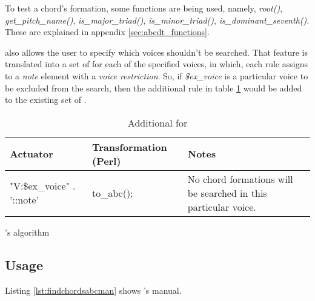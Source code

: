 To test a chord's formation, some \abcdt{} functions are being used, namely, \emph{root()},
\emph{get\_pitch\_name()}, \emph{is\_major\_triad()}, \emph{is\_minor\_triad()},
\emph{is\_dominant\_seventh()}. These are explained in appendix \ref{sec:abcdt_functions}.

\findchordsabc{} also allows the user to specify which voices shouldn't be searched. That feature is
translated into a set of \abcdtrules{} for each of the specified voices, in which, each rule assigns
\toabc{} to a \emph{note} element with a \emph{voice restriction}. So, if \emph{\$ex\_voice} is a
particular voice to be excluded from the search, then the additional rule in table
\ref{tab:find_chords_abc_additional_rule} would be added to the existing set of \abcdtrules{}.

\begin{center}
  \begin{table}[h]
    \begin{tabular}{|p{4.5cm}|p{4cm}|p{6.5cm}|}
      \hline
      Actuator & Transformation (Perl) & Notes\\
      \hline
      \hline
      "V:\$ex\_voice" . '::note' & to\_abc(); & No chord formations will be searched in this
      particular voice.\\
      \hline
    \end{tabular}
    \caption{Additional \abcdtrules{} for \findchordsabc{}}
    \label{tab:find_chords_abc_additional_rule}
  \end{table}
\end{center}

\begin{algorithm}[H]
  \caption{\findchordsabc{}'s algorithm}
  \label{alg:findchordsabc}
\end{algorithm}

\subsection*{Usage}

Listing \ref{lst:findchordsabcman} shows \findchordsabc{}'s manual.\\



